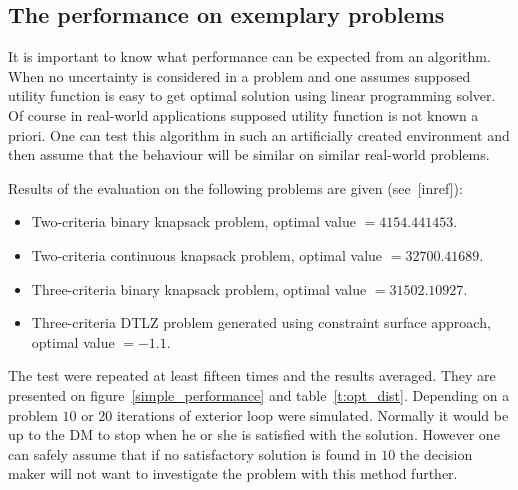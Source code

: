 \clearpage{}
\subsection{The performance on exemplary problems}
\label{nouncert-performance}
It is important to know what performance can be expected from an
algorithm. When no uncertainty is considered in a problem and one assumes
supposed utility function is easy to get optimal solution using linear
programming solver. Of course in real-world applications supposed utility
function is not known a priori. One can test this algorithm in such an
artificially created environment and then assume that the behaviour will be
similar on similar real-world problems.

Results of the evaluation on the following problems are given (see~[inref]):
\begin{itemize}
\item Two-criteria binary knapsack problem, optimal value $= 4154.441453$.
\item Two-criteria continuous knapsack problem, optimal value $= 32700.41689$.
\item Three-criteria binary knapsack problem, optimal value $= 31502.10927$.
\item Three-criteria DTLZ problem generated using constraint surface approach, optimal value $= -1.1$.
\end{itemize}

The test were repeated at least fifteen times and the results averaged. They
are presented on figure~\ref{simple_performance} and
table~\ref{t:opt_dist}. Depending on a problem $10$ or $20$ iterations of
exterior loop were simulated. Normally it would be up to the DM to stop when
he or she is satisfied with the solution. However one can safely assume that
if no satisfactory solution is found in $10$ the decision maker will not want
to investigate the problem with this method further.

